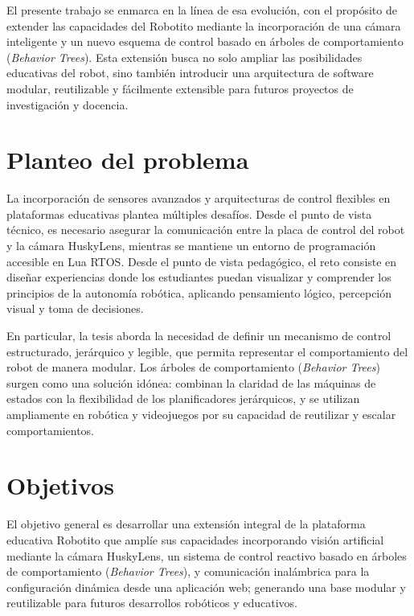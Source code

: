 \documentclass{prgrado}
\begin{document}
El presente trabajo se enmarca en la línea de esa evolución, con el propósito de extender las capacidades del Robotito mediante la incorporación de una cámara inteligente y un nuevo esquema de control basado en árboles de comportamiento (\textit{Behavior Trees}). Esta extensión busca no solo ampliar las posibilidades educativas del robot, sino también introducir una arquitectura de software modular, reutilizable y fácilmente extensible para futuros proyectos de investigación y docencia.

\section{Planteo del problema}
La incorporación de sensores avanzados y arquitecturas de control flexibles en plataformas educativas plantea múltiples desafíos. Desde el punto de vista técnico, es necesario asegurar la comunicación entre la placa de control del robot y la cámara HuskyLens, mientras se mantiene un entorno de programación accesible en Lua RTOS. Desde el punto de vista pedagógico, el reto consiste en diseñar experiencias donde los estudiantes puedan visualizar y comprender los principios de la autonomía robótica, aplicando pensamiento lógico, percepción visual y toma de decisiones.

En particular, la tesis aborda la necesidad de definir un mecanismo de control estructurado, jerárquico y legible, que permita representar el comportamiento del robot de manera modular. Los árboles de comportamiento (\textit{Behavior Trees}) surgen como una solución idónea: combinan la claridad de las máquinas de estados con la flexibilidad de los planificadores jerárquicos, y se utilizan ampliamente en robótica y videojuegos por su capacidad de reutilizar y escalar comportamientos.

\section{Objetivos}

El objetivo general es desarrollar una extensión integral de la plataforma educativa Robotito que amplíe sus capacidades incorporando visión artificial mediante la cámara HuskyLens, un sistema de control reactivo basado en árboles de comportamiento (\textit{Behavior Trees}), y comunicación inalámbrica para la configuración dinámica desde una aplicación web; generando una base modular y reutilizable para futuros desarrollos robóticos y educativos.
\end{document}
